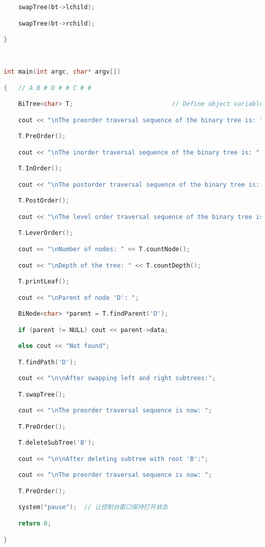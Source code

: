 \begin{lstlisting}[language=C++]
    swapTree(bt->lchild);

    swapTree(bt->rchild);

}

  

int main(int argc, char* argv[])

{   // A B # D # # C # #

    BiTree<char> T;                           // Define object variable T

    cout << "\nThe preorder traversal sequence of the binary tree is: ";

    T.PreOrder();

    cout << "\nThe inorder traversal sequence of the binary tree is: ";

    T.InOrder();

    cout << "\nThe postorder traversal sequence of the binary tree is: ";

    T.PostOrder();

    cout << "\nThe level order traversal sequence of the binary tree is: ";

    T.LeverOrder();

    cout << "\nNumber of nodes: " << T.countNode();

    cout << "\nDepth of the tree: " << T.countDepth();

    T.printLeaf();

    cout << "\nParent of node 'D': ";

    BiNode<char> *parent = T.findParent('D');

    if (parent != NULL) cout << parent->data;

    else cout << "Not found";

    T.findPath('D');

    cout << "\n\nAfter swapping left and right subtrees:";

    T.swapTree();

    cout << "\nThe preorder traversal sequence is now: ";

    T.PreOrder();

    T.deleteSubTree('B');

    cout << "\n\nAfter deleting subtree with root 'B':";

    cout << "\nThe preorder traversal sequence is now: ";

    T.PreOrder();

    system("pause");  // 让控制台窗口保持打开状态

    return 0;

}
\end{lstlisting}